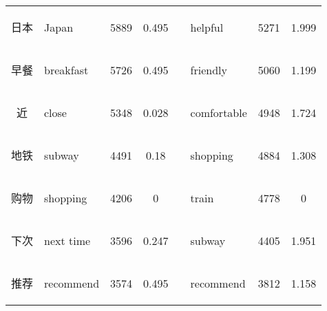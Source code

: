 \documentclass[smallextended,natbib]{svjour3}       %
\begin{document}
\begin{table}[h]
{\begin{tabular}{|c|l|c|c|l|l|c|c|}
    \begin{CJK}{UTF8}{gbsn} 日本 \end{CJK}            & Japan                                     & 5889               & 0.495               &                                & helpful                            & 5271               & 1.999               \\ \cline{1-4} \cline{6-8} 
    \begin{CJK}{UTF8}{gbsn} 早餐 \end{CJK}            & breakfast                                 & 5726               & 0.495               &                                & friendly                           & 5060               & 1.199               \\ \cline{1-4} \cline{6-8} 
    \begin{CJK}{UTF8}{gbsn} 近 \end{CJK}             & close                                     & 5348               & 0.028               &                                & comfortable                        & 4948               & 1.724               \\ \cline{1-4} \cline{6-8} 
    \begin{CJK}{UTF8}{gbsn} 地铁 \end{CJK}            & subway                                    & 4491               & 0.18                &                                & shopping                           & 4884               & 1.308               \\ \cline{1-4} \cline{6-8} 
    \begin{CJK}{UTF8}{gbsn} 购物 \end{CJK}            & shopping                                  & 4206               & 0                   &                                & train                              & 4778               & 0                   \\ \cline{1-4} \cline{6-8} 
    \begin{CJK}{UTF8}{gbsn} 下次 \end{CJK}            & next time                                 & 3596               & 0.247               &                                & subway                             & 4405               & 1.951               \\ \cline{1-4} \cline{6-8} 
    \begin{CJK}{UTF8}{gbsn} 推荐 \end{CJK}            & recommend                                 & 3574               & 0.495               &                                & recommend                          & 3812               & 1.158               \\ \cline{1-4} \cline{6-8} 
    \end{tabular}%
    }
    \end{table}
\end{document}
